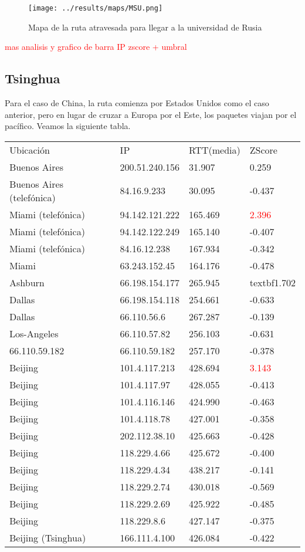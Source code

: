 \begin{figure}[H]
	\begin{center}
		  \texttt{[image: ../results/maps/MSU.png]}
		  \caption{Mapa de la ruta atravesada para llegar a la universidad de Rusia}
	\end{center}
\end{figure}

\textcolor{red}{mas analisis y grafico de barra IP zscore + umbral}

\subsection{Tsinghua}

Para el caso de China, la ruta comienza por Estados Unidos como el caso anterior, pero en lugar de cruzar a Europa por el Este, los paquetes viajan por el pac\'ifico.
Veamos la siguiente tabla.

\begin{tabular}{llll}
	Ubicaci\'on	&	IP	&	RTT(media)	&	ZScore	\\
	Buenos Aires	&	200.51.240.156	&	31.907	&	0.259	\\
	Buenos Aires (telef\'onica)	&	84.16.9.233	&	30.095	&	-0.437	\\
	Miami (telef\'onica)		&	94.142.121.222	&	165.469	&	\textcolor{red}{2.396}	\\
	Miami (telef\'onica)		&	94.142.122.249	&	165.140	&	-0.407	\\
	Miami (telef\'onica)		&	84.16.12.238	&	167.934	&	-0.342	\\
	Miami 			&	63.243.152.45	&	164.176	&	-0.478	\\
	Ashburn			&	66.198.154.177	&	265.945	&	textbf{1.702}	\\
	Dallas			&	66.198.154.118	&	254.661	&	-0.633	\\
	Dallas			&	66.110.56.6	&	267.287	&	-0.139	\\
	Los-Angeles		&	66.110.57.82	&	256.103	&	-0.631	\\
	66.110.59.182		&	66.110.59.182	&	257.170	&	-0.378	\\
	Beijing			&	101.4.117.213	&	428.694	&	\textcolor{red}{3.143}	\\
	Beijing			&	101.4.117.97	&	428.055	&	-0.413	\\
	Beijing			&	101.4.116.146	&	424.990	&	-0.463	\\
	Beijing			&	101.4.118.78	&	427.001	&	-0.358	\\
	Beijing			&	202.112.38.10	&	425.663	&	-0.428	\\
	Beijing			&	118.229.4.66	&	425.672	&	-0.400	\\
	Beijing			&	118.229.4.34	&	438.217	&	-0.141	\\
	Beijing			&	118.229.2.74	&	430.018	&	-0.569	\\
	Beijing			&	118.229.2.69	&	425.922	&	-0.485	\\
	Beijing			&	118.229.8.6	&	427.147	&	-0.375	\\
	Beijing (Tsinghua)		&	166.111.4.100	&	426.084	&	-0.422	\\

\end{tabular}

